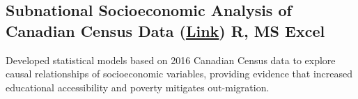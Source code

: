 \subsection{{Subnational Socioeconomic Analysis of Canadian Census Data  (\href{https://github.com/Francis-Calingo/CATEGORICAL-SOCIOECONOMIC-DATA-ANALYSIS-OF-CANADIAN-REGIONS}{Link}) \hfill  R, MS Excel}}
Developed statistical models based on 2016 Canadian Census data to explore causal relationships of socioeconomic variables, providing evidence that increased educational accessibility and poverty mitigates out-migration.